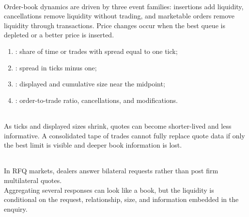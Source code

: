 \begin{mechanism} \\
Order-book dynamics are driven by three event families: insertions add liquidity, cancellations remove liquidity without trading, and marketable orders remove liquidity through transactions. Price changes occur when the best queue is depleted or a better price is inserted.
\end{mechanism}

\begin{taxonomy} 
\begin{enumerate}[label=\roman*.]
\setlength{\itemsep}{0pt}
\item {}: share of time or trades with spread equal to one tick;
\item {}: spread in ticks minus one;
\item {}: displayed and cumulative size near the midpoint;
\item {}: order-to-trade ratio, cancellations, and modifications.
\end{enumerate}
\end{taxonomy}

\begin{caveat} \\
As ticks and displayed sizes shrink, quotes can become shorter-lived and less informative. A consolidated tape of trades cannot fully replace quote data if only the best limit is visible and deeper book information is lost.
\end{caveat}

\begin{caveat} \\
In RFQ markets, dealers answer bilateral requests rather than post firm multilateral quotes.\\
Aggregating several responses can look like a book, but the liquidity is conditional on the request, relationship, size, and information embedded in the enquiry.
\end{caveat}
